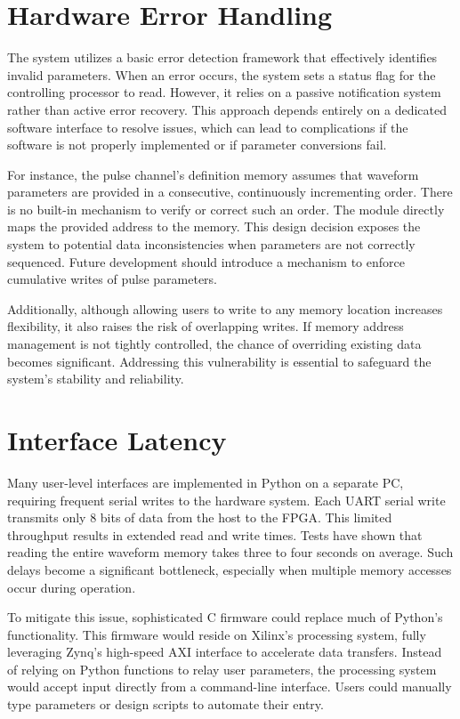 \section{Hardware Error Handling}

The system utilizes a basic error detection framework that effectively identifies invalid parameters. When an error occurs, the system sets a status flag for the controlling processor to read. However, it relies on a passive notification system rather than active error recovery. This approach depends entirely on a dedicated software interface to resolve issues, which can lead to complications if the software is not properly implemented or if parameter conversions fail.

For instance, the pulse channel's definition memory assumes that waveform parameters are provided in a consecutive, continuously incrementing order. There is no built-in mechanism to verify or correct such an order. The module directly maps the provided address to the memory. This design decision exposes the system to potential data inconsistencies when parameters are not correctly sequenced. Future development should introduce a mechanism to enforce cumulative writes of pulse parameters. 

Additionally, although allowing users to write to any memory location increases flexibility, it also raises the risk of overlapping writes. If memory address management is not tightly controlled, the chance of overriding existing data becomes significant. Addressing this vulnerability is essential to safeguard the system's stability and reliability.

\section{Interface Latency}
Many user-level interfaces are implemented in Python on a separate PC, requiring frequent serial writes to the hardware system. Each UART serial write transmits only 8 bits of data from the host to the FPGA. This limited throughput results in extended read and write times. Tests have shown that reading the entire waveform memory takes three to four seconds on average. Such delays become a significant bottleneck, especially when multiple memory accesses occur during operation.

To mitigate this issue, sophisticated C firmware could replace much of Python's functionality. This firmware would reside on Xilinx's processing system, fully leveraging Zynq's high-speed AXI interface to accelerate data transfers. Instead of relying on Python functions to relay user parameters, the processing system would accept input directly from a command-line interface. Users could manually type parameters or design scripts to automate their entry.